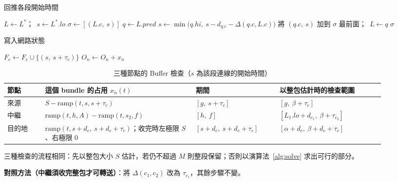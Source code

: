 \begin{algorithm}[htbp]
\caption{回推各段開始時間}
\label{alg:backtrack}
\begin{algorithmic}[1]
  \State $L \gets L^\ast$；\ $s \gets L^\ast.\mathit{lo}$ 
  \State $\sigma \gets [(L.c,\ s)]$
    \State $q \gets L.\mathit{pred}$
    \State $s \gets \min\bigl(q.\mathit{hi},\ s - d_{q.c} - \Delta(q.c, L.c)\bigr)$ 
    \State 將 $(q.c,\ s)$ 加到 $\sigma$ 最前面；\ $L \gets q$
  \EndWhile
  \State \Return $\sigma$
\EndFunction
\end{algorithmic}
\end{algorithm}

\begin{algorithm}[htbp]
\caption{寫入網路狀態}
\label{alg:commit}
\begin{algorithmic}[1]
    \State $F_c \gets F_c \cup \{(s,\ s + \tau_c)\}$
  \EndFor
    \State $O_n \gets O_n + x_n$ 
  \EndFor
\EndFunction
\end{algorithmic}
\end{algorithm}

\begin{table}[htbp]
\centering
\caption{三種節點的 Buffer 檢查（$s$ 為該段連線的開始時間）}
\label{tab:buffer-cases}
\small
\begin{tabular}{p{0.09\linewidth}p{0.36\linewidth}p{0.2\linewidth}p{0.25\linewidth}}
\hline
節點 & 這個 bundle 的占用 $x_n(t)$ & 期間 & 以整包估計時的檢查範圍 \\
\hline
來源 & $S - \mathrm{ramp}(t, s, s + \tau_c)$ & $[g,\ s + \tau_c]$ & $[g,\ \beta + \tau_c]$ \\
中繼 & $\mathrm{ramp}(t, h, A) - \mathrm{ramp}(t, s_2, f)$ & $[h,\ f]$ & $[L_1.\mathit{lo} + d_{c_1},\ \beta + \tau_{c_2}]$ \\
目的地 & $\mathrm{ramp}(t, s + d_c,\ s + d_c + \tau_c)$；收完時左極限 $S$、右極限 $0$ & $[s + d_c,\ s + d_c + \tau_c]$ & $[\alpha + d_c,\ \beta + d_c + \tau_c]$ \\
\hline
\end{tabular}
\end{table}

\noindent 三種檢查的流程相同：先以整包大小 $S$ 估計，若仍不超過 $M$ 則整段保留；否則以演算法~\ref{alg:solve} 求出可行的部分。

\medskip
\noindent\textbf{對照方法（中繼須收完整包才可轉送）}：將 $\Delta(c_1,c_2)$ 改為 $\tau_{c_1}$，其餘步驟不變。
